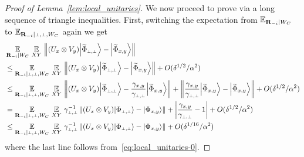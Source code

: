 \begin{proof}[Proof of Lemma~\ref{lem:local_unitaries}]
We now proceed to prove  via a long sequence of triangle inequalities. First, switching the expectation from $\operatorname*{\mathbb{E}}_{\mathbf{R}_{-i} | W_C}$ to $\Ex_{\bR_\mi | \dummy,\dummy,W_C}$ again we get
\begin{align}
&\Ex_{\bR_\mi | W_C} \, \Ex_{XY} \, \left \| (U_{x} \otimes V_{y}) \bigket{\wt{\Phi}_{\pp}} - \bigket{\wt{\Phi}_{\xy}} \right\| \notag \\
&\leq \Ex_{\bR_\mi | \dummy, \dummy, W_C} \, \Ex_{XY} \, \left \| (U_{x} \otimes V_{y}) \bigket{\wt{\Phi}_{\pp}} - \bigket{\wt{\Phi}_{\xy}} \right\| + O(\delta^{1/2}/\alpha^2) \notag \\
&\leq  \Ex_{\bR_\mi | \dummy, \dummy, W_C} \, \Ex_{XY} \, \left \| (U_{x} \otimes V_{y}) \bigket{\wt{\Phi}_{\pp}} - \frac{\gamma_\xy}{\gamma_\pp} \bigket{\wt{\Phi}_{\xy}} \right\| +  \left \| \frac{\gamma_\xy}{\gamma_\pp} \bigket{\wt{\Phi}_{\xy}} - \bigket{\wt{\Phi}_{\xy}} \right\| + O(\delta^{1/2}/\alpha^2) \notag \\
&= \Ex_{\bR_\mi | \dummy, \dummy, W_C} \, \Ex_{XY} \, \gamma_\pp^{-1} \left \| (U_{x} \otimes V_{y}) \bigket{{\Phi}_{\pp}} - \bigket{{\Phi}_{\xy}} \right\| +  \left | \frac{\gamma_\xy}{\gamma_\pp} -1  \right|+ O(\delta^{1/2}/\alpha^2) \notag \\
&\leq \Ex_{\bR_\mi | \dummy, \dummy, W_C} \, \Ex_{XY} \, \gamma_\pp^{-1} \left \| (U_{x} \otimes V_{y}) \bigket{{\Phi}_{\pp}} - \bigket{{\Phi}_{\xy}} \right\| + O(\delta^{1/16}/\alpha^2) \label{eq:local_unitaries-1}
\end{align}
where the last line follows from~\eqref{eq:local_unitaries-0}.


\end{proof}
